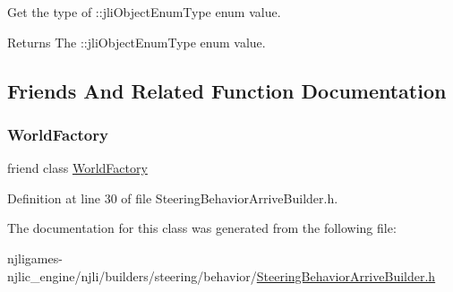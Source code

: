 Get the type of \+::jli\+Object\+Enum\+Type enum value.

\begin{DoxyReturn}{Returns}
The \+::jli\+Object\+Enum\+Type enum value. 
\end{DoxyReturn}


\subsection{Friends And Related Function Documentation}
\mbox{\label{classnjli_1_1_steering_behavior_arrive_builder_acb96ebb09abe8f2a37a915a842babfac}} 
\subsubsection{\texorpdfstring{World\+Factory}{WorldFactory}}
{\footnotesize\ttfamily friend class \mbox{\hyperlink{classnjli_1_1_world_factory}{World\+Factory}}\hspace{0.3cm}{\ttfamily [friend]}}



Definition at line 30 of file Steering\+Behavior\+Arrive\+Builder.\+h.



The documentation for this class was generated from the following file\+:\begin{DoxyCompactItemize}
\item 
njligames-\/njlic\+\_\+engine/njli/builders/steering/behavior/\mbox{\hyperlink{_steering_behavior_arrive_builder_8h}{Steering\+Behavior\+Arrive\+Builder.\+h}}\end{DoxyCompactItemize}
